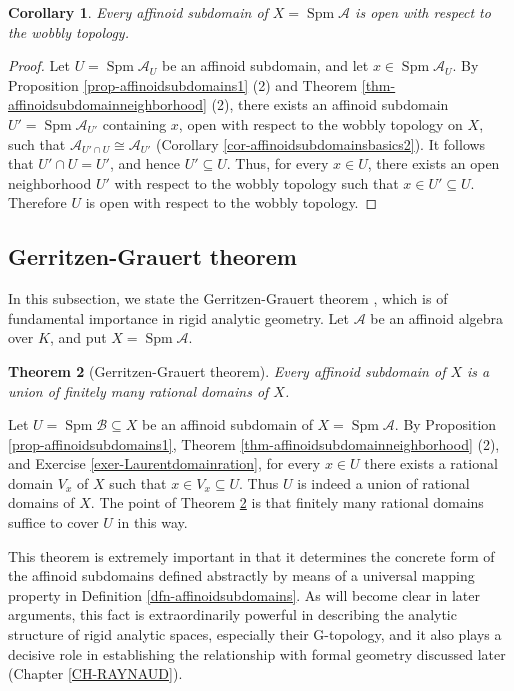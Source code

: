 \documentclass[a4paper,12pt, dvipdfmx]{jsbook}
\def\Spm{\mathop{\mathrm{Spm}}\nolimits}
\theoremstyle{plain}
\newtheorem{thm}{\bfseries Theorem}[section]
\newtheorem{cor}[thm]{\bfseries Corollary}
\theoremstyle{definition}
\begin{document}
\begin{cor}\label{cor-opennessaffinoidsubdomains}{\rm 
Every affinoid subdomain of $X=\Spm\mathcal{A}$ is open with respect to the wobbly topology.}
\end{cor}

\begin{proof}[Proof]
Let $U=\Spm\mathcal{A}_U$ be an affinoid subdomain, and let $x\in\Spm\mathcal{A}_U$.
By Proposition \ref{prop-affinoidsubdomains1} (2) and Theorem \ref{thm-affinoidsubdomainneighborhood} (2), there exists an affinoid subdomain $U'=\Spm\mathcal{A}_{U'}$ containing $x$, open with respect to the wobbly topology on $X$, such that $\mathcal{A}_{U'\cap U}\cong\mathcal{A}_{U'}$ (Corollary \ref{cor-affinoidsubdomainsbasics2}).
It follows that $U'\cap U=U'$, and hence $U'\subseteq U$.
Thus, for every $x\in U$, there exists an open neighborhood $U'$ with respect to the wobbly topology such that $x\in U'\subseteq U$.
Therefore $U$ is open with respect to the wobbly topology.
\end{proof}

\subsection{Gerritzen-Grauert theorem}\label{sub-GG}
In this subsection, we state the Gerritzen-Grauert theorem \cite[\S7.3.5, Cor.\ 3]{BGR}, which is of fundamental importance in rigid analytic geometry.
Let $\mathcal{A}$ be an affinoid algebra over $K$, and put $X=\Spm\mathcal{A}$.
\begin{thm}[Gerritzen-Grauert theorem]\label{thm-GG1}{\rm 
Every affinoid subdomain of $X$ is a union of finitely many rational domains of $X$.}
\end{thm}

Let $U=\Spm\mathcal{B}\subseteq X$ be an affinoid subdomain of $X=\Spm\mathcal{A}$.
By Proposition \ref{prop-affinoidsubdomains1}, Theorem \ref{thm-affinoidsubdomainneighborhood} (2), and Exercise \ref{exer-Laurentdomainration}, for every $x\in U$ there exists a rational domain $V_x$ of $X$ such that $x\in V_x\subseteq U$.
Thus $U$ is indeed a union of rational domains of $X$.
The point of Theorem \ref{thm-GG1} is that finitely many rational domains suffice to cover $U$ in this way.

This theorem is extremely important in that it determines the concrete form of the affinoid subdomains defined abstractly by means of a universal mapping property in Definition \ref{dfn-affinoidsubdomains}.
As will become clear in later arguments, this fact is extraordinarily powerful in describing the analytic structure of rigid analytic spaces, especially their G-topology, and it also plays a decisive role in establishing the relationship with formal geometry discussed later (Chapter \ref{CH-RAYNAUD}).
\end{document}

